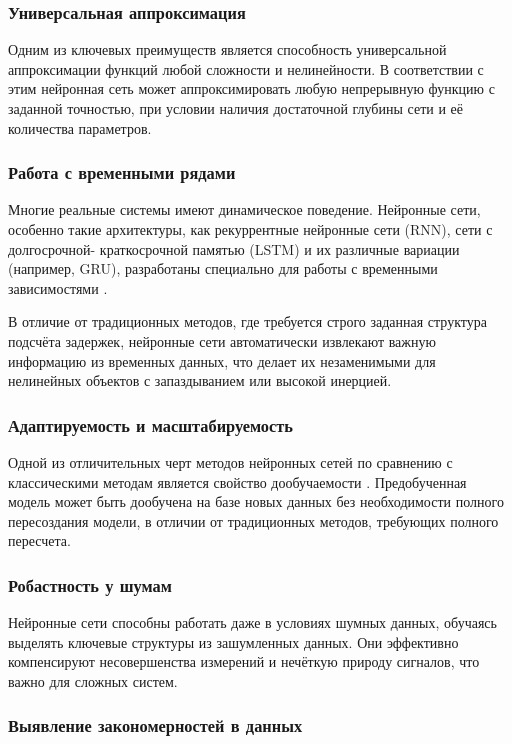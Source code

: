 \subsubsection{Универсальная аппроксимация}
Одним из ключевых преимуществ является способность универсальной аппроксимации
функций любой сложности и нелинейности. В соответствии с этим нейронная сеть
может аппроксимировать любую непрерывную функцию с заданной точностью, при
условии наличия достаточной глубины сети и её количества параметров.

\subsubsection{Работа с временными рядами}

Многие реальные системы имеют динамическое поведение. Нейронные сети, особенно
такие архитектуры, как рекуррентные нейронные сети (RNN), сети с долгосрочной-
краткосрочной памятью (LSTM) и их различные вариации (например, GRU),
разработаны специально для работы с временными зависимостями
\cite{bib:ident:neural:fundumentals}.

В отличие от традиционных методов, где требуется строго заданная структура
подсчёта задержек, нейронные сети автоматически извлекают важную информацию из
временных данных, что делает их незаменимыми для нелинейных объектов с
запаздыванием или высокой инерцией.

\subsubsection{Адаптируемость и масштабируемость}

Одной из отличительных черт методов нейронных сетей по сравнению с классическими
методам является свойство дообучаемости \cite{bib:ident:modelling:complex}.
Предобученная модель может быть дообучена на базе новых данных без необходимости
полного пересоздания модели, в отличии от традиционных методов, требующих
полного пересчета.

\subsubsection{Робастность у шумам}

Нейронные сети способны работать даже в условиях шумных данных, обучаясь
выделять ключевые структуры из зашумленных данных. Они эффективно компенсируют
несовершенства измерений и нечёткую природу сигналов, что важно для сложных
систем.

\subsubsection{Выявление закономерностей в данных}

